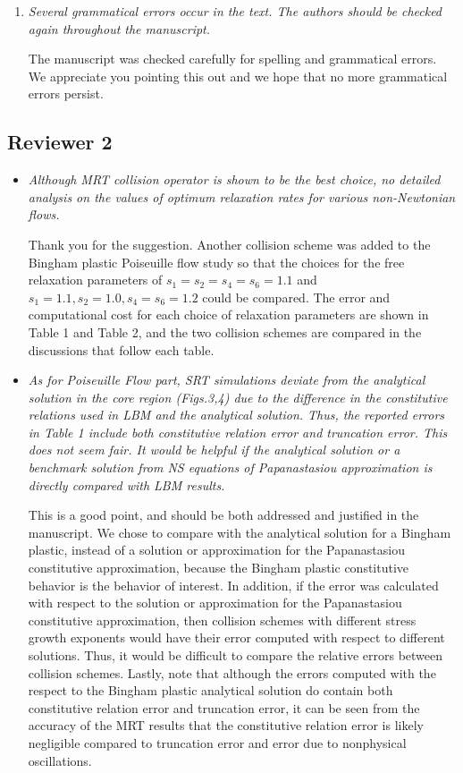 \documentclass{article}
\begin{document}
\begin{enumerate}
		\item \emph{Several grammatical errors occur in the text. The authors should be checked again throughout the manuscript.}
		
		The manuscript was checked carefully for spelling and grammatical errors. We appreciate you pointing this out and we hope that no more grammatical errors persist.
	
	\end{enumerate}

	\subsection*{Reviewer 2}
	
	\begin{itemize}
		
	\item \emph{Although MRT collision operator is shown to be the best choice, no detailed analysis on the values of optimum relaxation rates for various non-Newtonian flows.}
	
	Thank you for the suggestion. Another collision scheme was added to the Bingham plastic Poiseuille flow study so that the choices for the free relaxation parameters of $s_1 = s_2 = s_4 = s_6 = 1.1$ and $s_1 = 1.1, s_2 = 1.0, s_4 = s_6 = 1.2$ could be compared. The error and computational cost for each choice of relaxation parameters are shown in Table 1 and Table 2, and the two collision schemes are compared in the discussions that follow each table.
		
	\item \emph{As for Poiseuille Flow part, SRT simulations deviate from the analytical solution in the core region (Figs.3,4) due to the difference in the constitutive relations used in LBM and the analytical solution. Thus, the reported errors in Table 1 include both constitutive relation error and truncation error. This does not seem fair. It would be helpful if the analytical solution or a benchmark solution from NS equations of Papanastasiou approximation is directly compared with LBM results.}
	
	This is a good point, and should be both addressed and justified in the manuscript. We chose to compare with the analytical solution for a Bingham plastic, instead of a solution or approximation for the Papanastasiou constitutive approximation, because the Bingham plastic constitutive behavior is the behavior of interest. In addition, if the error was calculated with respect to the solution or approximation for the Papanastasiou constitutive approximation, then collision schemes with different stress growth exponents would have their error computed with respect to different solutions. Thus, it would be difficult to compare the relative errors between collision schemes. Lastly, note that although the errors computed with the respect to the Bingham plastic analytical solution do contain both constitutive relation error and truncation error, it can be seen from the accuracy of the MRT results that the constitutive relation error is likely negligible compared to truncation error and error due to nonphysical oscillations.
	

\end{itemize}
\end{document}
